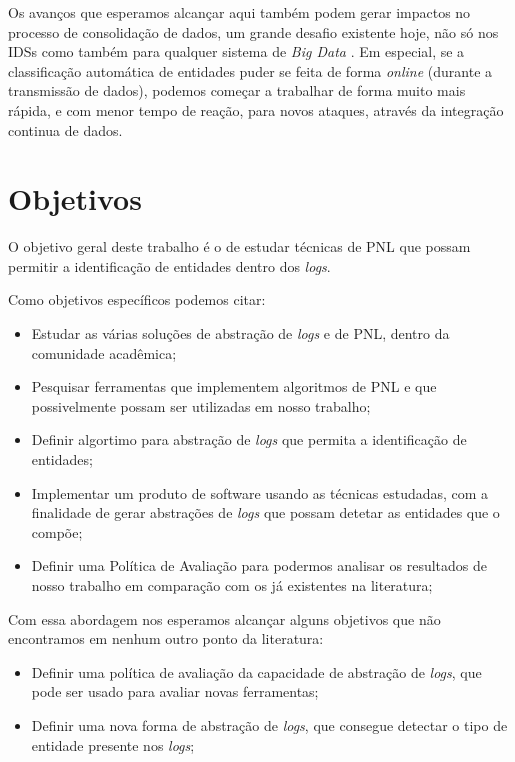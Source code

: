 \documentclass[
	12pt,				%
	openright,			%
	twoside,			%
	a4paper,			%
	english,			%
	spanish,			%
	brazil,				%
	]{abntex2}
\begin{document}
Os avanços que esperamos alcançar aqui também podem gerar impactos no processo de consolidação de dados, um grande desafio existente hoje, não só nos IDSs como também para qualquer sistema de \emph{Big Data} \cite{zuech2015intrusion}. Em especial, se a classificação automática de entidades puder se feita de forma \emph{online} (durante a transmissão de dados), podemos começar a trabalhar de forma muito mais rápida, e com menor tempo de reação, para novos ataques, através da integração continua de dados.


\section{Objetivos}
O objetivo geral deste trabalho é o de estudar técnicas de PNL que possam permitir a identificação de entidades dentro dos \emph{logs}.

Como objetivos específicos podemos citar:
\begin{itemize}
	\item Estudar as várias soluções de abstração de \emph{logs} e de PNL, dentro da comunidade acadêmica;
	
	\item Pesquisar ferramentas que implementem algoritmos de PNL e que possivelmente possam ser utilizadas em nosso trabalho;
	
	\item Definir algortimo para abstração de \emph{logs} que permita a identificação de entidades;
	
	\item Implementar um produto de software usando as técnicas estudadas, com a finalidade de gerar abstrações de \emph{logs} que possam detetar as entidades que o compõe;
	
	\item Definir uma Política de Avaliação para podermos analisar os resultados de nosso trabalho em comparação com os já existentes na literatura;
	
\end{itemize}

Com essa abordagem nos esperamos alcançar alguns objetivos que não encontramos em nenhum outro ponto da literatura:

\begin{itemize}
	\item Definir uma política de avaliação da capacidade de abstração de \emph{logs}, que pode ser usado para avaliar novas ferramentas;
	\item Definir uma nova forma de abstração de \emph{logs}, que consegue detectar o tipo de entidade presente nos \emph{logs};
\end{itemize}
\end{document}
